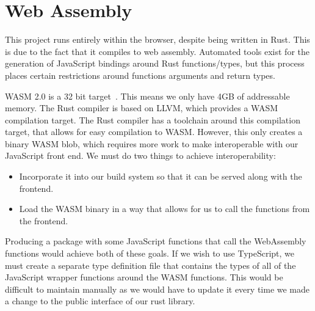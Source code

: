 

\section{Web Assembly} \label{bg:wasm}\label{bg:wasm-pack}\label{bg:wasm-bindgen}

This project runs entirely within the browser, despite being written in Rust. This is due to the fact that it compiles to web assembly. Automated tools exist for the generation of JavaScript bindings around Rust functions/types, but this process places certain restrictions around functions arguments and return types. 


\ac{WASM} 2.0 is a 32 bit target~\cite{WebAssemblyCoreSpecification2}. This means we only have 4GB of addressable memory. The Rust compiler is based on LLVM, which provides a \ac{WASM} compilation target. The Rust compiler has a toolchain around this compilation target, that allows for easy compilation to \ac{WASM}. However, this only creates a binary \ac{WASM} blob, which requires more work to make interoperable with our JavaScript front end. We must do two things to achieve interoperability:
\begin{itemize}
    \item Incorporate it into our build system so that it can be served along with the frontend.
    \item Load the \ac{WASM} binary in a way that allows for us to call the functions from the frontend.
\end{itemize}
Producing a package with some JavaScript functions that call the WebAssembly functions would achieve both of these goals. If we wish to use TypeScript, we must create a separate type definition file that contains the types of all of the JavaScript wrapper functions around the \ac{WASM} functions. This would be difficult to maintain manually as we would have to update it every time we made a change to the public interface of our rust library. 

